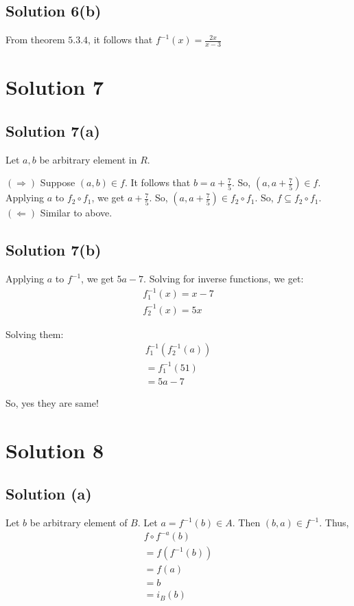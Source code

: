 \documentclass{article}
\begin{document}
\subsection{Solution 6(b)}
From theorem $5.3.4$, it follows that $f^{-1}(x) = \frac{2x}{x-3}$

\section{Solution 7}
\subsection{Solution 7(a)}
Let $a,b$ be arbitrary element in $R$.

$(\Rightarrow)$ Suppose $(a,b) \in f$. It follows that
$b = a + \frac{7}{5}$. So, $(a,a+\frac{7}{5}) \in f$. Applying $a$ to
$f_2 \circ f_1$, we get $a + \frac{7}{5}$. So, $(a, a+\frac{7}{5}) \in
f_2 \circ f_1$. So, $f \subseteq f_2 \circ f_1$.
$(\Leftarrow)$ Similar to above.

\subsection{Solution 7(b)}
Applying $a$ to $f^{-1}$, we get $5a - 7$. Solving for inverse
functions, we get:
\begin{align*}
  f_1^{-1}(x) = x - 7 \\
  f_2^{-1}(x) = 5x
\end{align*}

Solving them:
\begin{align*}
  f_1^{-1}(f_2^{-1}(a)) \\
  = f_1^{-1}(51) \\
  = 5a - 7
\end{align*}

So, yes they are same!

\section{Solution 8}
\subsection{Solution (a)}
Let $b$ be arbitrary element of $B$. Let $a = f^{-1}(b) \in A$. Then
$(b,a) \in f^{-1}$. Thus,
\begin{align*}
  f \circ f^{-a}(b) \\
  = f(f^{-1}(b)) \\
  = f(a) \\
  = b \\
  = i_B(b)
\end{align*}
\end{document}
